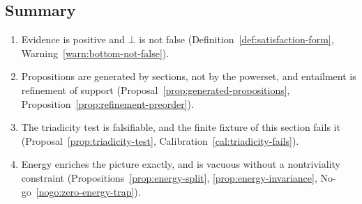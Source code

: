 \subsection{Summary}

\begin{enumerate}
\item Evidence is positive and $\bot$ is not false
  (Definition~\ref{def:satisfaction-form}, Warning~\ref{warn:bottom-not-false}).
\item Propositions are generated by sections, not by the powerset, and entailment is
  refinement of support (Proposal~\ref{prop:generated-propositions},
  Proposition~\ref{prop:refinement-preorder}).
\item The triadicity test is falsifiable, and the finite fixture of this section fails it
  (Proposal~\ref{prop:triadicity-test}, Calibration~\ref{cal:triadicity-fails}).
\item Energy enriches the picture exactly, and is vacuous without a nontriviality
  constraint (Propositions~\ref{prop:energy-split}, \ref{prop:energy-invariance},
  No-go~\ref{nogo:zero-energy-trap}).
\end{enumerate}
